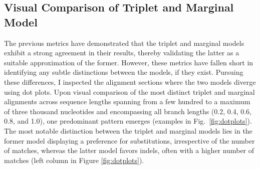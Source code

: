 \clearpage

\subsection{Visual Comparison of Triplet and Marginal Model} %

The previous metrics have demonstrated that the triplet and marginal models exhibit a strong agreement in their results, thereby validating the latter as a suitable approximation of the former. However, these metrics have fallen short in identifying any subtle distinctions between the models, if they exist. Pursuing these differences, I inspected the alignment sections where the two models diverge using dot plots. Upon visual comparison of the most distinct triplet and marginal alignments across sequence lengths spanning from a few hundred to a maximum of three thousand nucleotides and encompassing all branch lengths (0.2, 0.4, 0.6, 0.8, and 1.0), one predominant pattern emerges (examples in Fig.~\ref{fig:dotplots}). The most notable distinction between the triplet and marginal models lies in the former model displaying a preference for substitutions, irrespective of the number of matches, whereas the latter model favors indels, often with a higher number of matches (left column in Figure \ref{fig:dotplots}).
 
